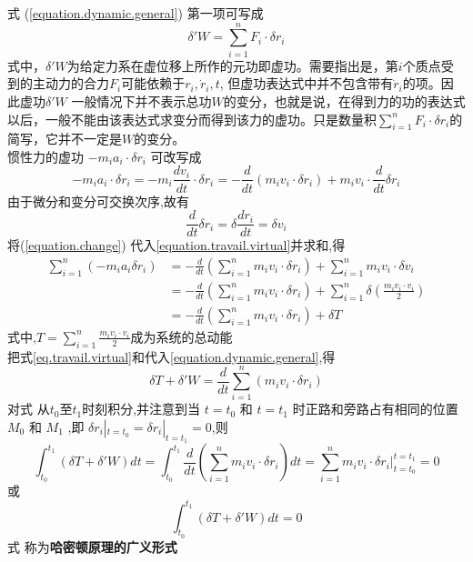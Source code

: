 \documentclass{book}
\begin{document}
式 (\ref{equation.dynamic.general})
第一项可写成
\begin{equation}
 \delta 'W=\sum_{i=1}^n F_i \cdot \delta r_i
 \label{eq.travail.virtual}
\end{equation}
式中，$\delta'W$为给定力系在虚位移上所作的元功即虚功。需要指出是，第$i$个质点受到的主动力的合力$F_i$可能依赖于$r_i,\dot{r}_i,t$,
但虚功表达式中并不包含带有$\dot{r}_i$的项。因此虚功$\delta 'W$ 一般情况下并不表示总功$W$的变分，也就是说，在得到力的功的表达式以后，一般不能由该表达式求变分而得到该力的虚功。只是数量积$\sum_{i=1}^n F_i \cdot \delta r_i$的简写，它并不一定是$W$的变分。
\\
惯性力的虚功
$
-m_ia_i\cdot \delta r_i
$
可改写成
\begin{equation}
-m_ia_i\cdot \delta r_i=-m_i \frac{dv_i}{dt} \cdot \delta r_i = - \frac{d}{dt}(m_i v_i \cdot \delta r_i) + m_i v_i \cdot \frac{d}{dt}\delta r_i
\label{equation.travail.virtual}
\end{equation}
由于微分和变分可交换次序,故有
\begin{equation}
 \frac{d}{dt}\delta r_i =\delta \frac{dr_i}{dt} =\delta v_i
 \label{equation.change}
\end{equation}
将(\ref{equation.change}) 代入\eqref{equation.travail.virtual}并求和,得
\begin{equation}
 \begin{split}
  \sum_{i=1}^n (-m_ia_i \delta r_i)& = -\frac{d}{dt}(\sum_{i=1}^n m_i v_i \cdot \delta r_i) + \sum_{i=1}^n m_i v_i\cdot \delta v_i\\
  & = -\frac{d}{dt}(\sum_{i=1}^n m_i v_i \cdot \delta r_i) + \sum_{i=1}^n \delta (\frac{m_i v_i \cdot v_i}{2}) \\
  & = -\frac{d}{dt}(\sum_{i=1}^n m_i v_i \cdot \delta r_i) + \delta T
 \end{split}
\end{equation}
式中,$T=\sum_{i=1}^n \frac{m_i v_i \cdot v_i}{2}$成为系统的总动能
\\
把式\eqref{eq.travail.virtual}和\lasteq 代入\eqref{equation.dynamic.general},得
\begin{equation}
 \delta T + \delta 'W =\frac{d}{dt}\sum_{i=1}^n (m_i v_i \cdot \delta r_i)
\end{equation}
对式 \lasteq 从$t_0$至$t_1$时刻积分,并注意到当
$t=t_0$ 和 $t=t_1$
时正路和旁路占有相同的位置 $M_0$ 和 $M_1$ ,即
$ \delta r_i|_{t=t_0}= \delta r_i|_{t=t_1}= 0 $,则
\begin{equation}
 \int_{t_0}^{t_1}(\delta T + \delta ' W)dt=\int_{t_0}^{t_1}\frac{d}{dt}(\sum_{i=1}^n m_i v_i \cdot \delta r_i)dt=\sum_{i=1}^n m_i v_i \cdot \delta r_i|_{t=t_0}^{t=t_1}=0
\end{equation}
或
\begin{equation}
 \int_{t_0}^{t_1}(\delta T + \delta ' W)dt=0
\end{equation}
式 \lasteq 称为\textbf{哈密顿原理的广义形式}
\end{document}
